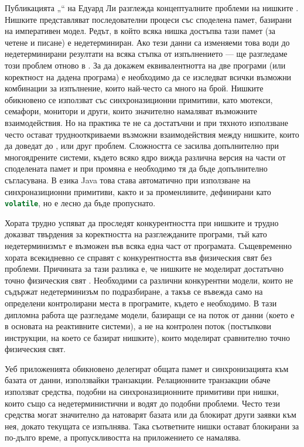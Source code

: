 Публикацията „“ на Едуард Ли разглежда концептуалните проблеми на нишките \cite{lee2006TheProblemWithThreads}. Нишките представляват последователни процеси със споделена памет, базирани на императивен модел. Редът, в който всяка нишка достъпва тази памет (за четене и писане) е недетерминиран. Ако тези данни са изменяеми това води до недетерминирани резултати на всяка стъпка от изпълнението — ще разгледаме този проблем отново в . За да докажем еквивалентнотта на две програми (или коректност на дадена програма) е необходимо да се изследват всички възможни комбинации за изпълнение, които най-често са много на брой. Нишките обикновено се използват със синхроназиционни примитиви, като мютекси, семафори, монитори и други, които значително намаляват възможните взаимодействия. Но на практика те не са достатъчни и при тяхното използване често остават труднооткриваеми възможни взаимодействия между нишките, които да доведат до ,  или друг проблем. Сложността се засилва допълнително при многоядрените системи, където всяко ядро вижда различна версия на части от споделената памет и при промяна е необходимо тя да бъде допълнително съгласувана. В езика Java това става автоматично при използване на синхроназиционни примитиви, както и за променливите, дефинирани като \lstinline[language=Java]{volatile}, но е лесно да бъде пропуснато.

Хората трудно успяват да проследят конкурентността при нишките и трудно доказват твърдения за коректността на разглежданите програми, тъй като недетерминизмът е възможен във всяка една част от програмата. Същевременно хората всекидневно се справят с конкурентността във физическия свят без проблеми. Причината за тази разлика е, че нишките не моделират достатъчно точно физическия свят  \cite{lee2006TheProblemWithThreads}. Необходими са различни конкурентни модели, които не съдържат недетерминизъм по подразбиране, а такъв се въвежда само на определени контролирани места в програмите, където е необходимо. В тази дипломна работа ще разгледаме модели, базиращи се на поток от данни (което е в основата на реактивните системи), а не на контролен поток (постъпкови инструкции, на което се базират нишките), които моделират сравнително точно физическия свят.

Уеб приложенията обикновено делегират общата памет и синхронизацията към базата от данни, използвайки транзакции. Релационните транзакции обаче използват средства, подобни на синхроназиционните примитиви при нишки, които също са недетерминистични и водят до подобни проблеми. Често тези средства могат значително да натоварят базата или да блокират други заявки към нея, докато текущата се изпълнява. Така съответните нишки остават блокирани за по-дълго време, а пропускливостта на приложението се намалява.


